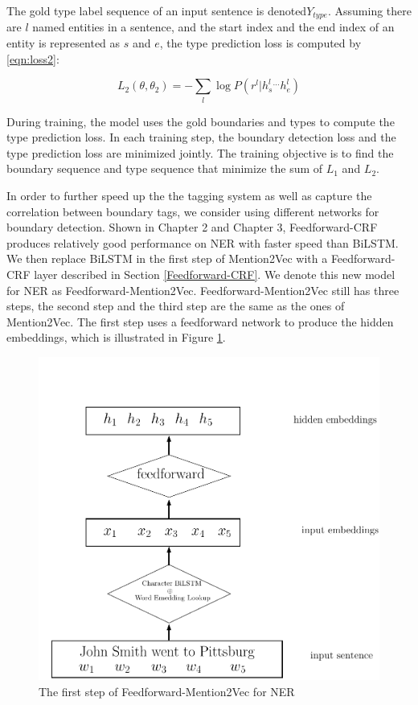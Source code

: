 \documentclass{sfuthesis}
\begin{document}
The gold type label sequence of an input sentence is denoted$Y_{type}$. Assuming there are $l$ named entities in a sentence, and the start index and the end index of an entity is represented as $s$ and $e$, the type prediction loss is computed by \ref{eqn:loss2}:

\begin{equation}\label{eqn:loss2}
  L_{2}\left( \theta ,\theta _{2}\right) =-\sum _{l}\log P\left( r^{l}|h_{s}^{l}^{\ldots }h_{e}^{l}\right)
\end{equation}

During training, the model uses the gold boundaries and types to compute the type prediction loss. In each training step, the boundary detection loss and the type prediction loss are minimized jointly. The training objective is to find the boundary sequence and type sequence that minimize the sum of $L_{1}$ and $L_{2}$.


In order to further speed up the the tagging system as well as capture the correlation between boundary tags, we consider using different networks for boundary detection. Shown in Chapter 2 and Chapter 3, Feedforward-CRF produces relatively good performance on NER with faster speed than BiLSTM. We then replace BiLSTM in the first step of Mention2Vec with a Feedforward-CRF layer described in Section \ref{Feedforward-CRF}. We denote this new model for NER as Feedforward-Mention2Vec. Feedforward-Mention2Vec still has three steps, the second step and the third step are the same as the ones of Mention2Vec. The first step uses a feedforward network to produce the hidden embeddings, which is illustrated in Figure \ref{fig:mention2vec4}.

\begin{figure}
  \centering
  \includegraphics[scale=0.6]{mention2vec4.pdf}
 \caption{The first step of Feedforward-Mention2Vec for NER}
  \label{fig:mention2vec4}
\end{figure}
\end{document}
